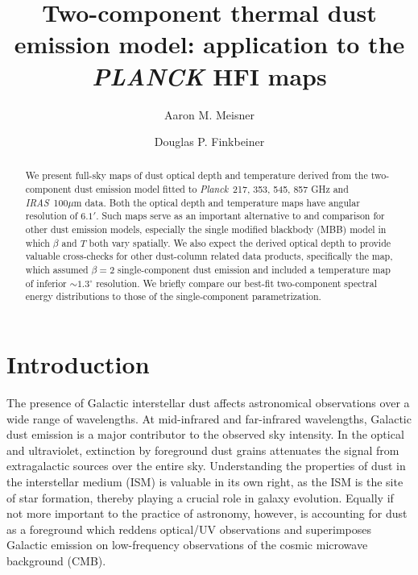 \documentclass{emulateapj}
\newcommand{\IRAS}{{\it IRAS}}
\newcommand{\PLANCK}{{\it Planck}}
\begin{document}
\title{Two-component thermal dust emission model: application to the {\it PLANCK} HFI maps}
\author{Aaron M. Meisner}
\author{Douglas P. Finkbeiner}

\begin{abstract}
We present full-sky maps of dust optical depth and temperature derived from 
the \cite{FDS99} two-component dust emission model fitted to \PLANCK~217, 353, 
545, 857 GHz and \cite{SFD} \IRAS~100$\mu$m data. Both the optical 
depth and temperature maps have angular resolution of $6.1'$. Such maps serve 
as an important alternative to and comparison for other dust 
emission models, especially the single modified blackbody (MBB) model in which 
$\beta$ and $T$ both vary spatially. We also expect the derived optical 
depth to provide valuable cross-checks for other dust-column related data 
products, specifically the \cite{SFD} map, which assumed 
$\beta = 2$ single-component dust emission and included a temperature map of 
inferior $\sim$$1.3^{\circ}$ resolution. We briefly compare our 
best-fit two-component spectral energy distributions to those of the 
\cite{planckdust} single-component parametrization.
\end{abstract}

\section{Introduction}
The presence of Galactic interstellar dust affects
astronomical observations over a wide range of wavelengths. At mid-infrared
and far-infrared wavelengths, Galactic dust emission is a major contributor
to the observed sky intensity. In the optical and ultraviolet, extinction
by foreground dust grains attenuates the signal from extragalactic sources
over the entire sky. Understanding the properties of dust in the interstellar 
medium (ISM) is valuable in its own right, as the ISM is the site of star 
formation, thereby playing a crucial role in galaxy evolution. Equally if not 
more important to the practice of astronomy, however, is accounting for dust 
as a foreground which reddens optical/UV observations and superimposes 
Galactic emission on low-frequency observations of the 
cosmic microwave background (CMB). 
\end{document}
